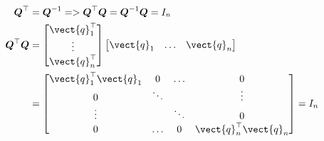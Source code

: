 \documentclass[12pt]{article}
\begin{document}
\begin{enumerate}
\begin{align*}
    \Q^\top &= \Q^{-1} => \Q^\top \Q = \Q^{-1} \Q = I_n \\
    \Q^\top \Q &= \begin{bmatrix}
        \vect{q}_1^\top \\
        \vdots \\
        \vect{q}_n^\top
    \end{bmatrix} \begin{bmatrix}
        \vect{q}_1 & \ldots & \vect{q}_n
    \end{bmatrix} \\
    &= \begin{bmatrix}
        \vect{q}_1^\top \vect{q}_1 & 0 & \ldots & 0 \\
        0 & \ddots & & \vdots \\
        \vdots & & \ddots & 0 \\
        0 & \ldots & 0 & \vect{q}_n^\top \vect{q}_n
    \end{bmatrix} = I_n
\end{align*}



\end{enumerate}
\end{document}
